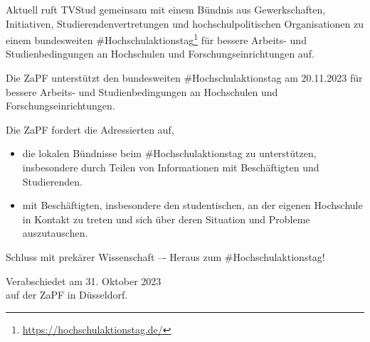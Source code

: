 \documentclass[DIV=calc]{scrartcl}
\begin{document}
Aktuell ruft TVStud gemeinsam mit einem Bündnis aus Gewerkschaften, Initiativen, Studierendenvertretungen und hochschulpolitischen Organisationen zu einem bundesweiten \#Hochschulaktionstag\footnote{\url{https://hochschulaktionstag.de/}} für bessere Arbeits- und Studienbedingungen an Hochschulen und Forschungseinrichtungen auf.

Die ZaPF unterstützt den bundesweiten \#Hochschulaktionstag am 20.11.2023 für bessere Arbeits- und Studienbedingungen an Hochschulen und Forschungseinrichtungen. 

Die ZaPF fordert die Adressierten auf,
\begin{itemize}
    \item die lokalen Bündnisse beim \#Hochschulaktionstag zu unterstützen, insbesondere durch Teilen von Informationen mit Beschäftigten und Studierenden.
    \item mit Beschäftigten, insbesondere den studentischen, an der eigenen Hochschule in Kontakt zu treten und sich über deren Situation und Probleme auszutauschen.
\end{itemize}

Schluss mit prekärer Wissenschaft –- Heraus zum \#Hochschulaktionstag!


%
\vfill
\begin{flushright}
	Verabschiedet am 31. Oktober 2023 \\
	auf der ZaPF in Düsseldorf.\\
\end{flushright}
\end{document}

